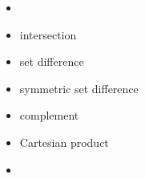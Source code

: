 \documentclass[12pt]{article}
\begin{document}
\begin{itemize}

\item {}


\item intersection


\item set difference

\item symmetric set difference


\item complement

%
\item Cartesian product


\item {}

\end{itemize}
\end{document}
